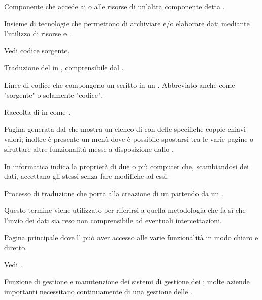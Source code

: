 {Componente che accede ai  o alle risorse di un'altra componente detta .} 

{Insieme di tecnologie che permettono di archiviare e/o elaborare dati mediante l'utilizzo di risorse  e  .}

{Vedi codice sorgente.}


{Traduzione del  in , comprensibile dal .}


{Linee di codice che compongono un  scritto in un . Abbreviato anche come "sorgente" o solamente "codice".}


{Raccolta di  in  come .}


{Pagina generata dal   che mostra un elenco di  con delle specifiche coppie chiavi-valori; inoltre è presente un menù dove è possibile spostarsi tra le varie pagine  o sfruttare altre funzionalità messe a disposizione dallo .}


{In informatica indica la proprietà di due o più computer che, scambiandosi dei dati, accettano gli stessi  senza fare modifiche ad essi.}


{Processo di traduzione che porta alla creazione di un  partendo da un .}


{Questo termine viene utilizzato per riferirsi a quella metodologia che fa sì che l'invio dei dati sia reso non comprensibile ad eventuali intercettazioni.}



{Pagina principale dove l' può aver accesso alle varie funzionalità in modo chiaro e diretto.}


{Vedi .}


{Funzione di gestione e manutenzione dei sistemi di gestione dei ; molte aziende importanti necessitano continuamente di una gestione delle .}


